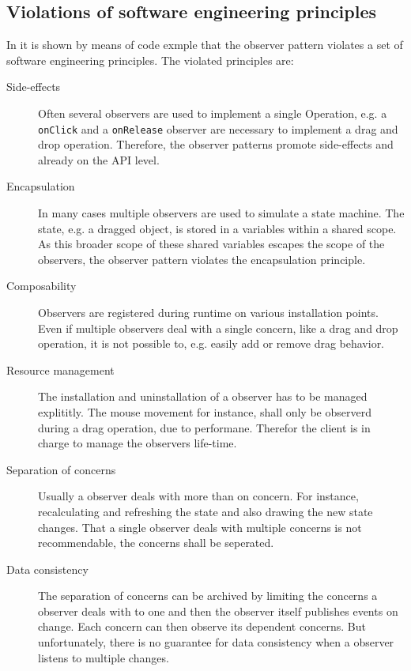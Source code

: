 \documentclass[format=acmtog]{acmart}
\begin{document}
	\subsection{Violations of software engineering principles}
		In \cite{Maier:2012} it is shown by means of code exmple that the observer pattern violates a set of software engineering principles.
		The violated principles are:
		\begin{description}
			\item[Side-effects]
			Often several observers are used to implement a single Operation,
			e.g. a \lstinline|onClick| and a \lstinline|onRelease| observer are necessary to implement a drag and drop operation.
			Therefore, the observer patterns promote side-effects and already on the API level.
			
			\item[Encapsulation]
			In many cases multiple observers are used to simulate a state machine. 
			The state, e.g. a dragged object, is stored in a variables within a shared scope.
			As this broader scope of these shared variables escapes the scope of the observers, the observer pattern violates the encapsulation principle.
			
			\item[Composability]
			Observers are registered during runtime on various installation points.
			Even if multiple observers deal with a single concern, like a drag and drop operation, it is not possible to, e.g. easily add or remove drag behavior.
			
			\item[Resource management]
			The installation and uninstallation of a observer has to be managed explititly.
			The mouse movement for instance, shall only be observerd during a drag operation, due to performane. 
			Therefor the client is in charge to manage the observers life-time.
			
			\item[Separation of concerns]
			Usually a observer deals with more than on concern. For instance, recalculating and refreshing the state and also drawing the new state changes.
			That a single observer deals with multiple concerns is not recommendable, the concerns shall be seperated.

			\item[Data consistency]
			The separation of concerns can be archived by limiting the concerns a observer deals with to one and then the observer itself publishes events on change.
			Each concern can then observe its dependent concerns.
			But unfortunately, there is no guarantee for data consistency when a observer listens to multiple changes. 


\end{description}
\end{document}
